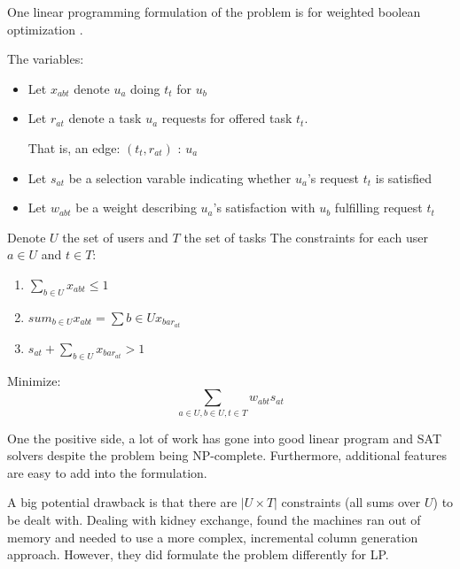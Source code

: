 \documentclass[main.tex]{subfiles}
\begin{document}
One linear programming formulation of the problem is for weighted boolean optimization \cite{Mar1}.

The variables:
\begin{itemize}
  \item Let $x_{abt}$ denote $u_a$ doing $t_t$ for $u_b$
  \item Let $r_{at}$ denote a task $u_a$ requests for offered task $t_t$.

        That is, an edge: $(t_t, r_{at})$ : $u_a$
  \item Let $s_{at}$ be a selection varable indicating whether $u_a$'s request $t_t$ is satisfied
  \item Let $w_{abt}$ be a weight describing $u_a$'s satisfaction with $u_b$ fulfilling request $t_t$
\end{itemize}

Denote $U$ the set of users and $T$ the set of tasks
The constraints for each user $a \in U$ and $t \in T$:
\begin{enumerate}
  \item $\sum_{b \in U} x_{abt} \leq 1$
  \item $sum_{b \in U} x_{abt} = \sum{b \in U} x_{bar_{at}}$
  \item $s_{at} + \sum_{b \in U} x_{bar_{at}} > 1$
\end{enumerate}

Minimize:
  $$\sum_{a \in U, b \in U, t \in T} w_{abt} s_{at}$$

One the positive side, a lot of work has gone into good linear program and SAT solvers despite the problem being NP-complete. Furthermore, additional features are easy to add into the formulation.

A big potential drawback is that there are $|U \times T|$ constraints (all sums over $U$) to be dealt with. Dealing with kidney exchange, \cite{Abr1} found the machines ran out of memory and needed to use a more complex, incremental column generation approach. However, they did formulate the problem differently for LP.
\end{document}
